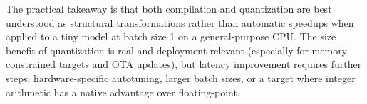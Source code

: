 \documentclass[fleqn,10pt]{olplainarticle}
\begin{document}
The practical takeaway is that both compilation and quantization are best understood as structural transformations rather than automatic speedups when applied to a tiny model at batch size 1 on a general-purpose CPU. The size benefit of quantization is real and deployment-relevant (especially for memory-constrained targets and OTA updates), but latency improvement requires further steps: hardware-specific autotuning, larger batch sizes, or a target where integer arithmetic has a native advantage over floating-point.

\newpage
\printbibliography
\end{document}
